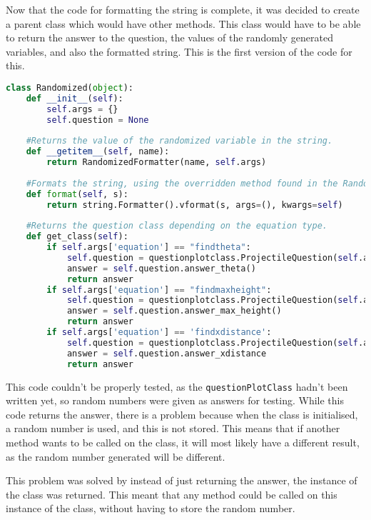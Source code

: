 Now that the code for formatting the string is complete, it was decided to create a parent class which would have other methods. This class would have to be able to return the answer to the question, the values of the randomly generated variables, and also the formatted string. This is the first version of the code for this.
\begin{lstlisting}[language=Python, caption=questionStore Parent Class v1]
class Randomized(object):
	def __init__(self):
		self.args = {}
		self.question = None
	
	#Returns the value of the randomized variable in the string.
	def __getitem__(self, name):
		return RandomizedFormatter(name, self.args)
	
	#Formats the string, using the overridden method found in the RandomizedFormatter class.
	def format(self, s):
		return string.Formatter().vformat(s, args=(), kwargs=self)
	
	#Returns the question class depending on the equation type.
	def get_class(self):
		if self.args['equation'] == "findtheta":
			self.question = questionplotclass.ProjectileQuestion(self.args['b'], self.args['a'], random.randint(40, 60))
			answer = self.question.answer_theta()
			return answer
		if self.args['equation'] == "findmaxheight":
			self.question = questionplotclass.ProjectileQuestion(self.args['c'], self.args['a'], self.args['b'])
			answer = self.question.answer_max_height()
			return answer
		if self.args['equation'] == 'findxdistance':
			self.question = questionplotclass.ProjectileQuestion(self.args['c'], self.args['a'], self.args['b'])
			answer = self.question.answer_xdistance
			return answer
\end{lstlisting}
This code couldn't be properly tested, as the \texttt{questionPlotClass} hadn't been written yet, so random numbers were given as answers for testing. While this code returns the answer, there is a problem because when the class is initialised, a random number is used, and this is not stored. This means that if another method wants to be called on the class, it will most likely have a different result, as the random number generated will be different.

This problem was solved by instead of just returning the answer, the instance of the class was returned. This meant that any method could be called on this instance of the class, without having to store the random number. 

